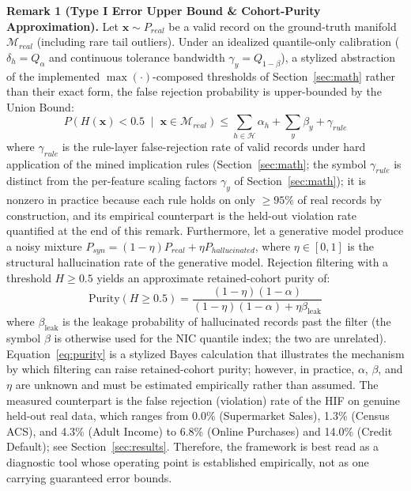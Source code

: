 \documentclass[pdflatex,sn-mathphys-num]{sn-jnl}
\theoremstyle{thmstyleone}%
\theoremstyle{thmstyletwo}%
\theoremstyle{thmstylethree}%
\begin{document}
\begin{appendices}
\textbf{Remark 1 (Type I Error Upper Bound \& Cohort-Purity Approximation).} Let $\mathbf{x} \sim P_{real}$ be a valid record on the ground-truth manifold $\mathcal{M}_{real}$ (including rare tail outliers). Under an idealized quantile-only calibration ($\delta_h = Q_{\alpha}$ and continuous tolerance bandwidth $\gamma_y = Q_{1-\beta}$), a stylized abstraction of the implemented $\max(\cdot)$-composed thresholds of Section~\ref{sec:math} rather than their exact form, the false rejection probability is upper-bounded by the Union Bound:
\begin{equation}
    P\left( H(\mathbf{x}) < 0.5 \;\middle|\; \mathbf{x} \in \mathcal{M}_{real} \right) \le \sum_{h \in \mathcal{H}} \alpha_h + \sum_{y} \beta_y + \gamma_{rule}
\end{equation}
where $\gamma_{rule}$ is the rule-layer false-rejection rate of valid records under hard application of the mined implication rules (Section~\ref{sec:math}; the symbol $\gamma_{rule}$ is distinct from the per-feature scaling factors $\gamma_y$ of Section~\ref{sec:math}); it is nonzero in practice because each rule holds on only $\ge 95\%$ of real records by construction, and its empirical counterpart is the held-out violation rate quantified at the end of this remark.
Furthermore, let a generative model produce a noisy mixture $P_{syn} = (1 - \eta) P_{real} + \eta P_{hallucinated}$, where $\eta \in [0, 1]$ is the structural hallucination rate of the generative model. Rejection filtering with a threshold $H \ge 0.5$ yields an approximate retained-cohort purity of:
\begin{equation}
    \text{Purity}(H \ge 0.5) = \frac{(1 - \eta)(1 - \alpha)}{(1 - \eta)(1 - \alpha) + \eta \beta_{\mathrm{leak}}}
    \label{eq:purity}
\end{equation}
where $\beta_{\mathrm{leak}}$ is the leakage probability of hallucinated records past the filter (the symbol $\beta$ is otherwise used for the NIC quantile index; the two are unrelated). Equation~\eqref{eq:purity} is a stylized Bayes calculation that illustrates the mechanism by which filtering can raise retained-cohort purity; however, in practice, $\alpha$, $\beta$, and $\eta$ are unknown and must be estimated empirically rather than assumed. The measured counterpart is the false rejection (violation) rate of the HIF on genuine held-out real data, which ranges from 0.0\% (Supermarket Sales), 1.3\% (Census ACS), and 4.3\% (Adult Income) to 6.8\% (Online Purchases) and 14.0\% (Credit Default); see Section~\ref{sec:results}. Therefore, the framework is best read as a diagnostic tool whose operating point is established empirically, not as one carrying guaranteed error bounds.


\end{appendices}
\end{document}
